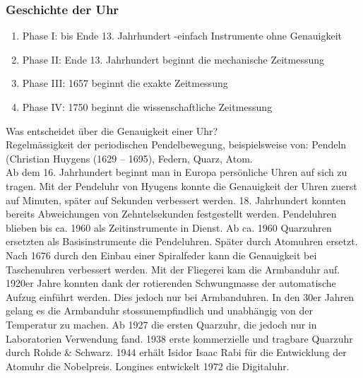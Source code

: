 \documentclass[10pt, openright=true]{scrartcl}
\begin{document}
\subsubsection{Geschichte der Uhr}
\begin{enumerate}
\item Phase I: bis Ende 13. Jahrhundert -einfach Instrumente ohne Genauigkeit
\item Phase II: Ende 13. Jahrhundert beginnt die mechanische Zeitmessung
\item Phase III: 1657 beginnt die exakte Zeitmessung
\item Phase IV: 1750 beginnt die wissenschaftliche Zeitmessung
\end{enumerate}
Was entscheidet über die Genauigkeit einer Uhr?\\
Regelmässigkeit der periodischen Pendelbewegung, beispielsweise von: Pendeln (Christian Huygens (1629 – 1695), Federn, Quarz, Atom. \\
Ab dem 16. Jahrhundert beginnt man in Europa persönliche Uhren auf sich zu tragen. Mit der Pendeluhr von Hyugens konnte die Genauigkeit der Uhren zuerst auf Minuten, später auf Sekunden verbessert werden. 18. Jahrhundert konnten bereits Abweichungen von Zehntelsekunden festgestellt werden. Pendeluhren blieben bis ca. 1960 als Zeitinstrumente in Dienst. Ab ca. 1960 Quarzuhren ersetzten als Basisinstrumente die Pendeluhren. Später durch Atomuhren ersetzt. Nach 1676 durch den Einbau einer Spiralfeder kann die Genauigkeit bei Taschenuhren verbessert werden. Mit der Fliegerei kam die Armbanduhr auf. 1920er Jahre konnten dank der rotierenden Schwungmasse der automatische Aufzug einführt werden. Dies jedoch nur bei Armbanduhren. In den 30er Jahren gelang es die Armbanduhr stossunempfindlich und unabhängig von der Temperatur zu machen. Ab 1927 die ersten Quarzuhr, die jedoch nur in Laboratorien Verwendung fand. 1938 erste kommerzielle und tragbare Quarzuhr durch Rohde \& Schwarz. 1944 erhält Isidor Isaac Rabi für die Entwicklung der Atomuhr die Nobelpreis. Longines entwickelt 1972 die Digitaluhr. 
\end{document}
